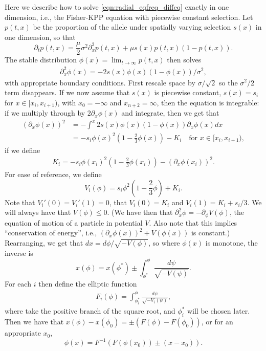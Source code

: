 \documentclass{article}
\begin{document}
Here we describe how to solve \eqref{eqn:radial_eqfreq_diffeq} exactly in one dimension,
i.e., the Fisher-KPP equation with piecewise constant selection.
Let $p(t,x)$ be the proportion of the allele under spatially varying selection $s(x)$ in one dimension,
so that 
\[
\partial_t p(t,x) = \frac{\mu}{2} \sigma^2 \partial_x^2 p(t,x) + \mu s(x) p(t,x) (1-p(t,x)) .
\]
The stable distribution $\phi(x) = \lim_{t\to\infty} p(t,x)$ then solves
\begin{align} \label{eqn:definingphi}
    \partial_x^2 \phi(x) = - 2 s(x) \phi(x) (1-\phi(x)) /\sigma^2,
\end{align}
with appropriate boundary conditions.
First rescale space by $\sigma/\sqrt{2}$ so the $\sigma^2/2$ term disappears.
If we now assume that $s(x)$ is piecewise constant,
$s(x) = s_i$ for $x \in [x_i,x_{i+1})$, with $x_0=-\infty$ and $x_{n+2}=\infty$,
then the equation is integrable: if we multiply through by $2\partial_x \phi(x)$ and integrate, then we get that
\begin{align} \label{eqn:conservation}
    ( \partial_x \phi(x) )^2  &= - \int^{x} 2 s(x) \phi(x) (1-\phi(x)) \partial_x \phi(x) dx \\
        &= - s_i \phi(x)^2 \left( 1 - \frac{2}{3} \phi(x) \right) - K_i \quad \mbox{for } x \in [x_i,x_{i+1}) ,
\end{align}
if we define
\begin{align} 
  K_i = - s_i \phi(x_i)^2 \left( 1 - \frac{2}{3} \phi(x_i) \right) - ( \partial_x \phi(x_i) )^2  .
\end{align}
For ease of reference, we define
\[
        V_i(\phi) = s_i \phi^2 \left( 1 - \frac{2}{3} \phi \right) + K_i .
\]
Note that $V_i'(0)=V_i'(1)=0$, that $V_i(0)=K_i$ and $V_i(1) = K_i+s_i/3$.  
We will always have that $V(\phi) \le 0$.
(We have then that $\partial_x^2 \phi = - \partial_\phi V(\phi)$, the equation of motion of a particle in potential $V$.
Also note that this implies ``conservation of energy'', i.e., $( \partial_x \phi(x) )^2 + V(\phi(x))$ is constant.)
Rearranging, we get that $dx = d\phi / \sqrt{-V(\phi)}$, so where $\phi(x)$ is monotone, the inverse is
\[
    x(\phi) = x(\phi^*) \pm \int_{\phi^*}^\phi \frac{ d\psi }{ \sqrt{ -V(\psi) } } .
\]
For each $i$ then define the elliptic function
\begin{align}  \label{eqn:elliptic_function}
    F_i(\phi) = \int_{\phi_i^*}^\phi \frac{ d\psi }{ \sqrt{ -V_i(\psi) } } ,
\end{align}
where take the positive branch of the square root, and $\phi_i^*$ will be chosen later.
Then we have that
$x(\phi) - x(\phi_0) = \pm( F(\phi) - F(\phi_0))$,
or for an appropriate $x_0$,
\[
    \phi(x) = F^{-1}\left( F(\phi(x_0)) \pm (x - x_0) \right).
\]
\end{document}
